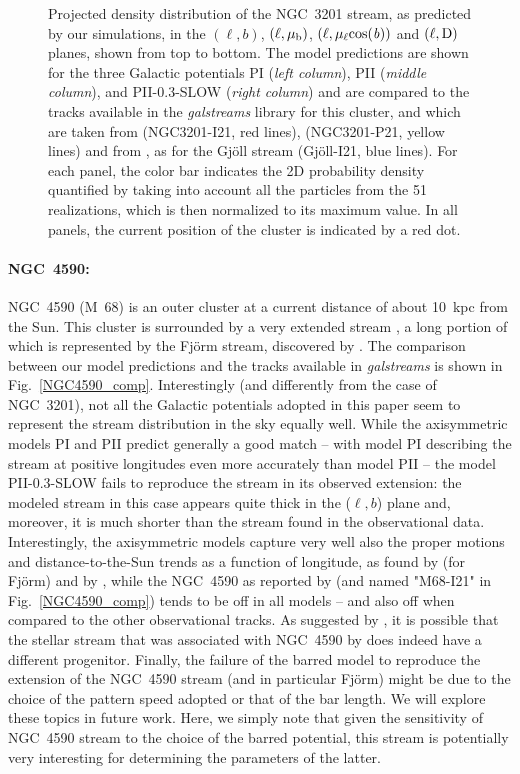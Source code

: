 \begin{figure}[h!]
                \caption{Projected density distribution of the NGC~3201 stream, as predicted by our simulations, in the $(\ell,b)$, $(\ell, \rm \mu_b)$,  $(\ell,  \rm \mu_{\ell}cos(\mathit{b}))$ and $(\ell, \rm D)$ planes, shown from top to bottom. The model predictions are shown for the three Galactic potentials  PI (\textit{left column}), PII (\textit{middle column}), and PII-0.3-SLOW (\textit{right column}) and are compared to the tracks available in the \textit{galstreams} library for this cluster, and which are taken from \citet{ibata21} (NGC3201-I21, red lines), \citet{palau21}  (NGC3201-P21, yellow lines) and from \citet{ibata21}, as for the Gj\"{o}ll stream  (Gj\"{o}ll-I21, blue lines). For each panel, the color bar indicates the 2D probability density quantified by taking into account all the particles from the 51 realizations, which is then normalized to its maximum value. In all panels, the current position of the cluster is indicated by a red dot.}\label{NGC3201_comp}
            \end{figure}
            \onecolumn

            \paragraph{NGC~4590: } NGC~4590 (M~68) is an outer cluster at a current distance of about 10~kpc from the Sun. This cluster is surrounded by a very extended stream \citep{palau19, ibata21}, a long portion of which is represented by the Fj\"{o}rm stream, discovered by \citet{ibata19b}. The comparison between our model predictions and the tracks available in \textit{galstreams} is shown in Fig.~\ref{NGC4590_comp}. Interestingly (and differently from the case of NGC~3201), not all the Galactic potentials adopted in this paper seem to represent the stream distribution in the sky equally well. While the axisymmetric models PI and PII predict generally a good match -- with model PI describing the stream at positive longitudes even more accurately than model PII -- the model PII-0.3-SLOW fails to reproduce the stream in its observed extension: the modeled stream in this case appears quite thick in the ($\ell, b$) plane and, moreover, it is much shorter than the stream found in the observational data. Interestingly, the axisymmetric models capture very well also the proper motions and distance-to-the-Sun trends as a function of longitude, as found by \citet{ibata21} (for  Fj\"{o}rm) and by \citet{palau19}, while the NGC~4590 as reported by \citet{ibata21} (and named "M68-I21" in Fig.~\ref{NGC4590_comp}) tends to be off in all models -- and also off when compared to the other observational tracks. As suggested by \citet{mateu22}, it is possible that the stellar stream that was associated with NGC~4590   by  \citet{ibata21}does indeed have a different progenitor.  Finally, the failure of the barred model to reproduce the extension of the NGC~4590 stream (and in particular Fj\"{o}rm)  might be due to the choice of the pattern speed adopted or that of the bar length. We will explore these topics in future work. Here, we simply note that given the sensitivity of NGC~4590 stream to the choice of the barred potential, this stream is potentially very interesting for determining the parameters of the latter. 

